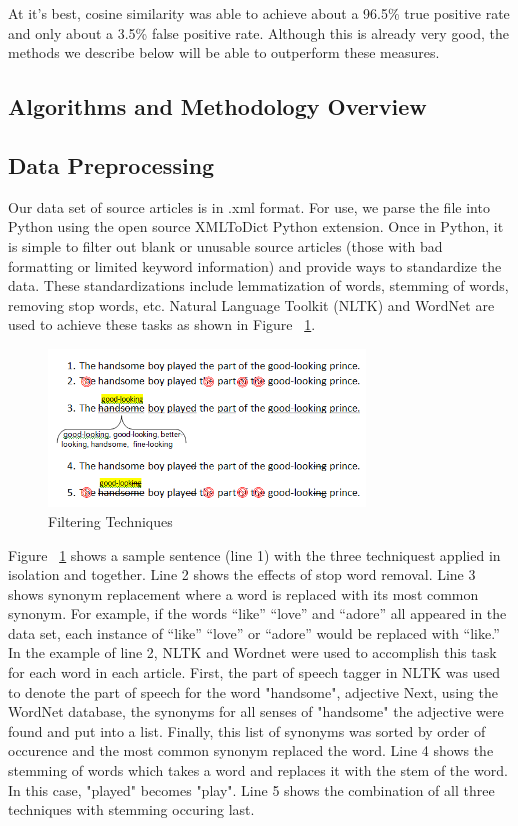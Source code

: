 \documentclass[11pt,letterpaper,oneside, titlepage]{scrartcl}
\begin{document}
\clearpage

At it’s best, cosine similarity was able to achieve about a 96.5\% true positive rate and only about a 3.5\% false positive rate. Although this is already very good, the methods we describe below will be able to outperform these measures.



\subsection{Algorithms and Methodology Overview}


\subsection{Data Preprocessing}

Our data set of source articles is in .xml format. For use, we parse the file into Python using the open source XMLToDict Python extension. Once in Python, it is simple to filter out blank or unusable source articles (those with bad formatting or limited keyword information) and provide ways to standardize the data. These standardizations include lemmatization of words, stemming of words, removing stop words, etc. Natural Language Toolkit (NLTK) and WordNet are used to achieve these tasks as shown in Figure ~\ref{fig:filtering}.

\begin{figure}[h!]
  \centering
  \includegraphics[width=0.75\textwidth]{filtering}
  \caption{Filtering Techniques}
  \label{fig:filtering}
\end{figure}

Figure ~\ref{fig:filtering} shows a sample sentence (line 1) with the three techniquest applied in isolation and together. Line 2 shows the effects of stop word removal. Line 3 shows synonym replacement where a word is replaced with its most common synonym. For example, if the words “like” “love” and “adore” all appeared in the data set, each instance of “like” “love” or “adore” would be replaced with “like.” In the example of line 2, NLTK and Wordnet were used to accomplish this task for each word in each article. First, the part of speech tagger in NLTK was used to denote the part of speech for the word "handsome", adjective Next, using the WordNet database, the synonyms for all senses of "handsome" the adjective were found and put into a list. Finally, this list of synonyms was sorted by order of occurence and the most common synonym replaced the word. Line 4 shows the stemming of words which takes a word and replaces it with the stem of the word. In this case, "played" becomes "play". Line 5 shows the combination of all three techniques with stemming occuring last.
\end{document}
